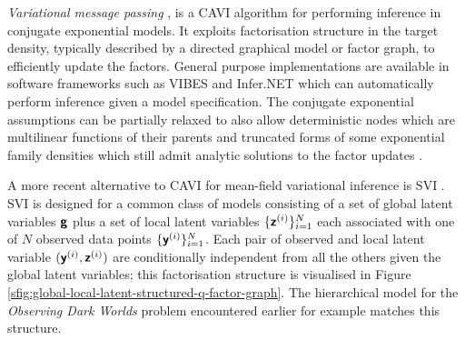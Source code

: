 \emph{Variational message passing} \citep{winn2005variational}, is a \ac{CAVI} algorithm for performing inference in conjugate exponential models. It exploits factorisation structure in the target density, typically described by a directed graphical model or factor graph, to efficiently update the factors. General purpose implementations are available in software frameworks such as VIBES \citep{bishop2002vibes} and Infer.NET \citep{minka2014infer} which can automatically perform inference given a model specification. The conjugate exponential assumptions can be partially relaxed to also allow deterministic nodes which are multilinear functions of their parents and truncated forms of some exponential family densities which still admit analytic solutions to the factor updates \citep{winn2005variational}.

A more recent alternative to \ac{CAVI} for mean-field variational inference is \ac{SVI} \citep{hoffman2013stochastic,sato2001online}. \ac{SVI} is designed for a common class of models consisting of a set of global latent variables $\boldsymbol{\mathsf{g}}$ plus a set of local latent variables $\lbrace \boldsymbol{\mathsf{z}}^{(i)}\rbrace_{i=1}^N$ each associated with one of $N$ observed data points $\lbrace \boldsymbol{\mathsf{y}}^{(i)}\rbrace_{i=1}^N$. Each pair of observed and local latent variable $(\boldsymbol{\mathsf{y}}^{(i)},\boldsymbol{\mathsf{z}}^{(i)})$ are conditionally independent from all the others given the global latent variables; this factorisation structure is visualised in Figure \ref{sfig:global-local-latent-structured-q-factor-graph}. The hierarchical model for the \emph{Observing Dark Worlds} problem encountered earlier for example matches this structure.

